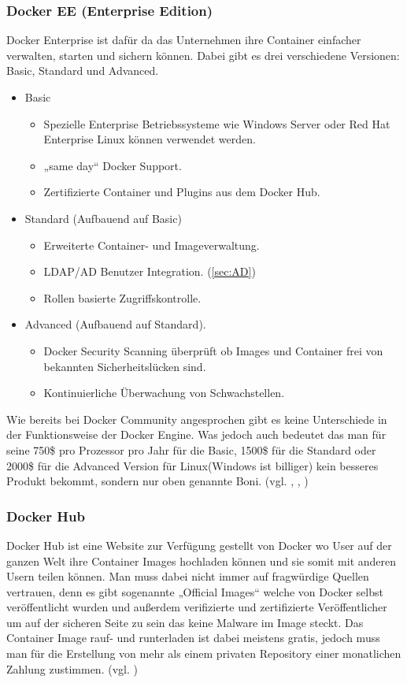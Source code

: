 \subsubsection{Docker EE (Enterprise Edition)}\label{ssec:DockerEE}
Docker Enterprise ist dafür da das Unternehmen ihre Container einfacher verwalten, starten und sichern können. Dabei gibt es drei verschiedene Versionen: Basic, Standard und Advanced.
\begin{itemize}
    \item Basic
    \begin{itemize}
        \item Spezielle Enterprise Betriebssysteme wie Windows Server oder Red Hat Enterprise Linux können verwendet werden.
        \item „same day“ Docker Support.
        \item Zertifizierte Container und Plugins aus dem Docker Hub.
    \end{itemize}
    \item Standard (Aufbauend auf Basic)
    \begin{itemize}
        \item Erweiterte Container- und Imageverwaltung.
        \item LDAP/AD Benutzer Integration. (\ref{sec:AD})
        \item Rollen basierte Zugriffskontrolle.
    \end{itemize}
    \item Advanced (Aufbauend auf Standard).
    \begin{itemize}
        \item Docker Security Scanning überprüft ob Images und Container frei von bekannten Sicherheitslücken sind.
        \item Kontinuierliche Überwachung von Schwachstellen.
    \end{itemize}
\end{itemize}
Wie bereits bei Docker Community angesprochen gibt es keine Unterschiede in der Funktionsweise der Docker Engine. Was jedoch auch bedeutet das man für seine 750\$ pro Prozessor pro Jahr für die Basic, 1500\$ für die Standard oder 2000\$ für die Advanced Version für Linux(Windows ist billiger) kein besseres Produkt bekommt, sondern nur oben genannte Boni. (vgl. \cite{DockerEE}, \cite{DockerEELicensing}, \cite{DockerEEPricing})
\subsubsection{Docker Hub} \label{ssec:DockerHub}
Docker Hub ist eine Website zur Verfügung gestellt von Docker wo User auf der ganzen Welt ihre Container Images hochladen können und sie somit mit anderen Usern teilen können. Man muss dabei nicht immer auf fragwürdige Quellen vertrauen, denn es gibt sogenannte „Official Images“ welche von Docker selbst veröffentlicht wurden und außerdem verifizierte und zertifizierte Veröffentlicher um auf der sicheren Seite zu sein das keine Malware im Image steckt. Das Container Image rauf- und runterladen ist dabei meistens gratis, jedoch muss man für die Erstellung von mehr als einem privaten Repository einer monatlichen Zahlung zustimmen. (vgl. \cite{DockerHub})
